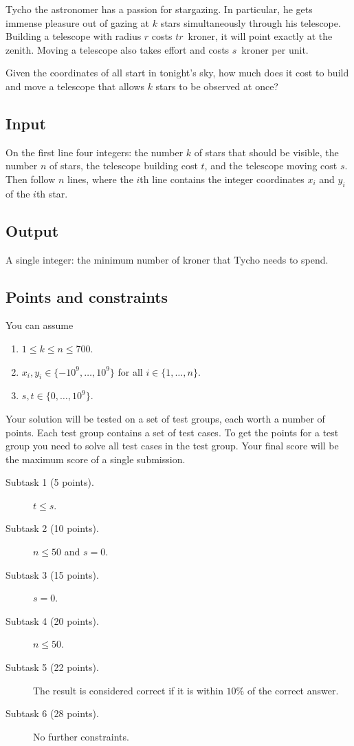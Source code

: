 
Tycho the astronomer has a passion for stargazing.
In particular, he gets immense pleasure out of gazing at $k$ stars simultaneously through his telescope.   
Building a telescope with radius $r$ costs $tr$~kroner, it will point exactly at the zenith.
Moving a telescope also takes effort and costs $s$~kroner per unit.

Given the coordinates of all start in tonight's sky, how much does it cost to build and move a telescope that allows $k$ stars to be observed at once?

\subsection*{Input}

On the first line four integers: the number $k$ of stars that should be visible, the number $n$ of stars, the telescope building cost $t$, and the telescope moving cost $s$.
Then follow $n$ lines, where the $i$th line contains the integer coordinates $x_i$ and $y_i$ of the $i$th star.

\subsection*{Output}

A single integer: the minimum number of kroner that Tycho needs to spend.

\subsection*{Points and constraints}

You can assume 
\begin{enumerate}
\item $1\leq k\leq n\leq 700$.
\item $x_i, y_i\in \{-10^9,\ldots, 10^9\}$ for all $i\in\{1,\ldots,n\}$.
\item $s, t\in \{0,\ldots, 10^9\}$.
\end{enumerate}

Your solution will be tested on a set of test groups, each worth a number of points.
Each test group contains a set of test cases.
To get the points for a test group you need to solve all test cases in the test group.
Your final score will be the maximum score of a single submission.

\begin{description}
\item[Subtask 1 (5 points).] $t\leq s$.
\item[Subtask 2 (10 points).] $n\le 50$ and $s=0$.
\item[Subtask 3 (15 points).] $s=0$.
\item[Subtask 4 (20 points).] $n\leq 50$.
\item[Subtask 5 (22 points).] The result is considered correct if it is within $10\%$ of the correct answer.
\item[Subtask 6 (28 points).] No further constraints.
\end{description}
